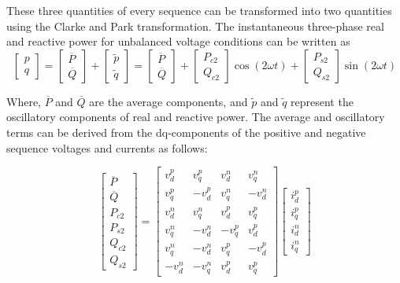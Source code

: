 \documentclass[conference]{IEEEtran}
\begin{document}
These three quantities of every sequence can be transformed into two quantities using the Clarke and Park transformation. The instantaneous three-phase real and reactive power for unbalanced voltage conditions can be written as
\begin{equation}
\begin{bmatrix} p \\ q \end{bmatrix} = \begin{bmatrix} \overline{P} \\ \overline{Q} \end{bmatrix} + \begin{bmatrix} \tilde{p} \\ \tilde{q} \end{bmatrix} = \begin{bmatrix} \overline{P} \\ \overline{Q} \end{bmatrix} + \begin{bmatrix} P_{c2} \\ Q_{c2} \end{bmatrix}\cos(2\omega t) + \begin{bmatrix} P_{s2} \\ Q_{s2} \end{bmatrix}\sin(2\omega t)
\end{equation}

Where, $\overline{P}$ and $\overline{Q}$ are the average components, and $\tilde{p}$ and $\tilde{q}$ represent the oscillatory components of real and reactive power. The average and oscillatory terms can be derived from the dq-components of the positive and negative sequence voltages and currents as follows:

\begin{equation}
\begin{bmatrix} \overline{P} \\ \overline{Q} \\ P_{c2} \\ P_{s2} \\ Q_{c2} \\ Q_{s2} \end{bmatrix} = \begin{bmatrix} v_d^p & v_q^p & v_d^n & v_q^n \\ v_q^p & -v_d^p & v_q^n & -v_d^n \\ v_d^n & v_q^n & v_d^p & v_q^p\\ v_q^n & -v_d^n & -v_q^p & v_d^p \\v_q^n & -v_d^n & v_q^p & -v_d^p \\ -v_d^n & -v_q^n & v_d^p & v_q^p \end{bmatrix} \begin{bmatrix} i_d^p \\ i_q^p \\ i_d^n \\ i_q^n \end{bmatrix}
\end{equation}
\end{document}
